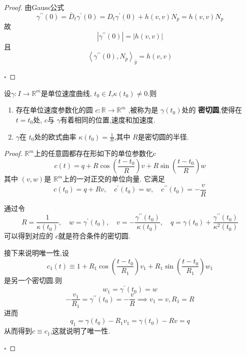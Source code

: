 \documentclass[../../几何与拓扑.tex]{subfiles}
\begin{document}
\begin{proof}
    由Gauss公式 \[
     \gamma ^{\prime \prime} \left( 0 \right)= \bar{D}_{t} \gamma ^{\prime} \left( 0 \right)= D_{t} \gamma ^{\prime} \left( 0 \right)+ h\left( v,v \right)N_{p}= h\left( v,v \right)N_{p}     
    \]故 \[
    \left|  \gamma ^{\prime \prime} \left( 0 \right)  \right|= \left| h\left( v,v \right)  \right|  
    \]且 \[
    \left< \gamma ^{\prime \prime} \left( 0 \right),N_{p}  \right>_{\bar{g}}= h\left( v,v \right) 
    \]

    \hfill $\square$
\end{proof}

\begin{proposition}
    设\(   \gamma :I\to \mathbb{R} ^{m}  \)是单位速度曲线, \(  t_0 \in I  \),\(   \kappa \left( t_0 \right)\neq 0   \).则 
    \begin{enumerate}
        \item 存在单位速度参数化的圆 \(  c:\mathbb{R} \to \mathbb{R} ^{m}  \) ,被称为是 \(   \gamma \left( t_0 \right)   \)处的 \textbf{密切圆},使得在 \(  t= t_0  \)处, \(  c  \)与 \(   \gamma   \)有着相同的位置,速度和加速度.
        \item  \(   \gamma   \)在 \(  t_0  \)处的欧式曲率 \(   \kappa \left( t_0 \right)= \frac{1 }{R }    \),其中 \(  R  \)是密切圆的半径.        
    \end{enumerate}
       
\end{proposition}

\begin{proof}
    \(  \mathbb{R} ^{m}  \)上的任意圆都存在形如下的单位参数化c \[
    c\left( t \right)=  q +  R \cos \left( \frac{t-t_0 }{ R}  \right)v+  R\sin \left( \frac{t-t_0 }{R }  \right)w   
    \] 其中 \(  \left( v,w \right)   \)是 \(  \mathbb{R} ^{m}  \)上的一对正交的单位向量. 它满足 \[
    c\left( t_0 \right)=  q+  Rv,\quad c^{\prime} \left( t_0 \right)= w,\quad c^{\prime \prime} \left( t_0 \right)= -\frac{v }{R }    
    \]  

    通过令 \[
    R= \frac{1 }{ \kappa \left( t_0 \right)  },\quad w =   \gamma ^{\prime} \left( t_0 \right),\quad v =  - \frac{ \gamma ^{\prime \prime} \left( t_0 \right)  }{ \kappa \left( t_0 \right)  },\quad q=  \gamma \left( t_0 \right)+ \frac{ \gamma ^{\prime \prime} \left( t_0 \right)  }{ \kappa ^{2}\left( t_0 \right)  }     
    \]可以得到对应的 \(  c  \)就是符合条件的密切圆.
    
    
    接下来说明唯一性,设 \[
  c_1\left( t \right)\equiv 1+ R_1\cos \left( \frac{t-t_0 }{R_1 }  \right)v_1+  R_1\sin \left( \frac{t-t_0 }{R_1 }  \right)w_1   
    \]是另一个密切圆.则 \[
    w_1=  \gamma ^{\prime} \left( t_0 \right)= w 
    \] \[
    -\frac{v_1 }{R_1 }=  \gamma ^{\prime \prime} \left( t_0 \right)= -\frac{v }{R }   \implies v_1= v, R_1= R
    \]进而 \[
    q_1=  \gamma \left( t_0 \right)-R_1v_1=  \gamma \left( t_0 \right)-Rv= q   
    \]从而得到\(  c\equiv c_1  \),这就说明了唯一性. 

    \hfill $\square$
\end{proof}
\end{document}
